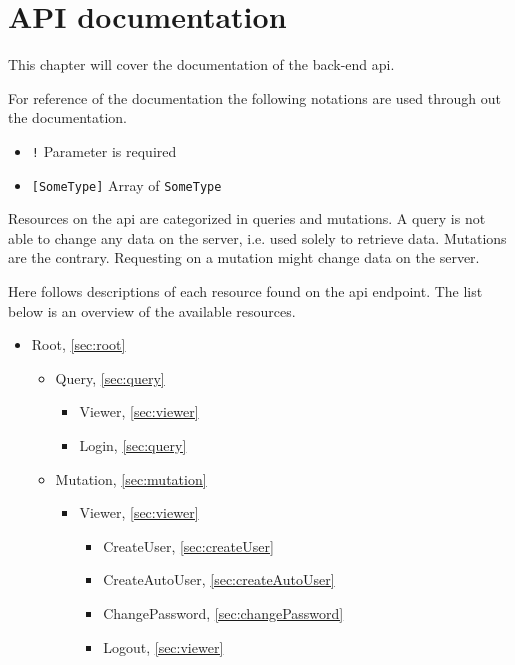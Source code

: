 \chapter{API documentation}
This chapter will cover the documentation of the back-end \gls{api}.

For reference of the  documentation \citep{graphql:typesystem} the following notations are used through out the documentation.

\begin{itemize}  
\item \verb+!+ Parameter is required
\item \verb+[SomeType]+ Array of \verb+SomeType+
\end{itemize}

Resources on the \gls{api} are categorized in queries and mutations.
A query is not able to change any data on the server, i.e. used solely to retrieve data.
Mutations are the contrary.
Requesting on a mutation might change data on the server.

Here follows descriptions of each resource found on the \gls{api} endpoint.
The list below is an overview of the available resources.

\begin{itemize}
\item Root, \ref{sec:root}
	\begin{itemize}
	\item Query, \ref{sec:query}
	    \begin{itemize}
	    \item Viewer, \ref{sec:viewer}
	    \item Login, \ref{sec:query}
	    \end{itemize}
	\item Mutation, \ref{sec:mutation}
	    \begin{itemize}
	    \item Viewer, \ref{sec:viewer}
		    \begin{itemize}
		    \item CreateUser, \ref{sec:createUser}
		    \item CreateAutoUser, \ref{sec:createAutoUser}
		    \item ChangePassword, \ref{sec:changePassword}
            \item Logout, \ref{sec:viewer}
		    \end{itemize}
	    \end{itemize}
	\end{itemize}
\end{itemize}

